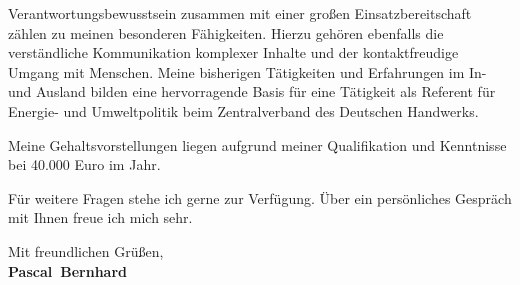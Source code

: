 \documentclass[11pt,a4paper]{article}
\def\firstname{Pascal}
\def\familyname{Bernhard}
\begin{document}
Verantwortungsbewusstsein zusammen mit einer großen Einsatzbereitschaft zählen zu meinen besonderen Fähigkeiten. Hierzu gehören ebenfalls die verständliche Kommunikation komplexer Inhalte und der kontaktfreudige Umgang mit Menschen. Meine bisherigen Tätigkeiten und Erfahrungen im In- und Ausland bilden eine hervorragende Basis für eine Tätigkeit als Referent für Energie- und Umweltpolitik beim Zentralverband des Deutschen Handwerks.

Meine Gehaltsvorstellungen liegen aufgrund meiner Qualifikation und Kenntnisse bei 40.000 Euro im Jahr.


Für weitere Fragen stehe ich gerne zur Verfügung. Über ein persönliches Gespräch mit Ihnen freue ich mich sehr.

  
Mit freundlichen Grüßen,\\[3em] %
%
{\bfseries \firstname~\familyname}\\
%
\end{document}

